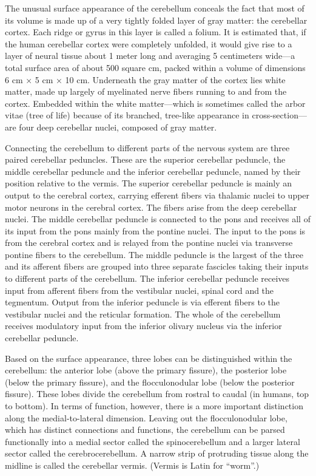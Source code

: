 The unusual surface appearance of the cerebellum conceals the fact that most of its volume is made up of a very tightly folded layer of gray matter: the cerebellar cortex. Each ridge or gyrus in this layer is called a folium. It is estimated that, if the human cerebellar cortex were completely unfolded, it would give rise to a layer of neural tissue about 1 meter long and averaging 5 centimeters wide---a total surface area of about 500 square cm, packed within a volume of dimensions 6 cm × 5 cm × 10 cm. Underneath the gray matter of the cortex lies white matter, made up largely of myelinated nerve fibers running to and from the cortex. Embedded within the white matter---which is sometimes called the arbor vitae (tree of life) because of its branched, tree-like appearance in cross-section---are four deep cerebellar nuclei, composed of gray matter.

Connecting the cerebellum to different parts of the nervous system are three paired cerebellar peduncles. These are the superior cerebellar peduncle, the middle cerebellar peduncle and the inferior cerebellar peduncle, named by their position relative to the vermis. The superior cerebellar peduncle is mainly an output to the cerebral cortex, carrying efferent fibers via thalamic nuclei to upper motor neurons in the cerebral cortex. The fibers arise from the deep cerebellar nuclei. The middle cerebellar peduncle is connected to the pons and receives all of its input from the pons mainly from the pontine nuclei. The input to the pons is from the cerebral cortex and is relayed from the pontine nuclei via transverse pontine fibers to the cerebellum. The middle peduncle is the largest of the three and its afferent fibers are grouped into three separate fascicles taking their inputs to different parts of the cerebellum. The inferior cerebellar peduncle receives input from afferent fibers from the vestibular nuclei, spinal cord and the tegmentum. Output from the inferior peduncle is via efferent fibers to the vestibular nuclei and the reticular formation. The whole of the cerebellum receives modulatory input from the inferior olivary nucleus via the inferior cerebellar peduncle.

Based on the surface appearance, three lobes can be distinguished within the cerebellum: the anterior lobe (above the primary fissure), the posterior lobe (below the primary fissure), and the flocculonodular lobe (below the posterior fissure). These lobes divide the cerebellum from rostral to caudal (in humans, top to bottom). In terms of function, however, there is a more important distinction along the medial-to-lateral dimension. Leaving out the flocculonodular lobe, which has distinct connections and functions, the cerebellum can be parsed functionally into a medial sector called the spinocerebellum and a larger lateral sector called the cerebrocerebellum. A narrow strip of protruding tissue along the midline is called the cerebellar vermis. (Vermis is Latin for ``worm''.)

